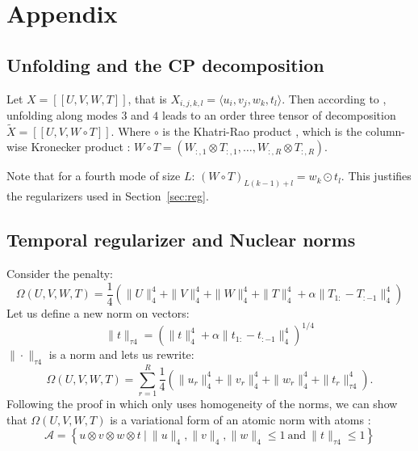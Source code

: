 \documentclass{article}
\newcommand{\brck}[1]{[\![#1]\!]}
\begin{document}
\section{Appendix}
\subsection{Unfolding and the CP decomposition}
\label{app:unfolding}
Let $X=\brck{U,V,W,T}$, that is $X_{i,j,k,l}=\langle u_i, v_j, w_k, t_l\rangle$. Then according to \citet{kolda_tensor_2009}, unfolding along modes $3$ and $4$ leads to an order three tensor of decomposition $\tilde{X}=\brck{U,V,W \circ T}$. Where $\circ$ is the Khatri-Rao product \citep{smilde2005multi}, which is the column-wise Kronecker product : $W\circ T = (W_{:,1}\otimes T_{:, 1}, \dots, W_{:,R}\otimes T_{:, R})$.

Note that for a fourth mode of size $L$: $\left(W \circ T\right)_{L(k-1)+l} = w_k \odot t_l$. This justifies the regularizers used in Section~\ref{sec:reg}.

\subsection{Temporal regularizer and Nuclear norms}
\label{app:temporal_nuclear}
Consider the penalty:
\begin{equation}
    \Omega(U,V,W,T) = \frac{1}{4}\left(\|U\|_4^4 + \|V\|_4^4 + \|W\|_4^4 + \|T\|_4^4 + \alpha\|T_{1:}-T_{:-1}\|_4^4\right)
\end{equation}
Let us define a new norm on vectors:
\begin{equation}
    \|t\|_{\tau 4} = \left(\|t\|_4^4+\alpha\|t_{1:}-t_{:-1}\|_4^4\right)^{1/4}
\end{equation}
$\|\cdot\|_{\tau 4}$ is a norm and lets us rewrite:
\begin{equation}
    \Omega(U,V,W,T) = \sum_{r=1}^R\frac{1}{4}\left(\|u_r\|_4^4 + \|v_r\|_4^4 + \|w_r\|_4^4 + \|t_r\|_{\tau 4}^4\right).
\end{equation}
Following the proof in \citet{lacroix2018canonical} which only uses homogeneity of the norms, we can show that $\Omega(U,V,W,T)$ is a variational form of an atomic norm with atoms :
$$\mathcal{A}=\left\{u\otimes v\otimes w\otimes t~|~\|u\|_4, \|v\|_4, \|w\|_4 \leq 1~\textrm{and}~\|t\|_{\tau 4}\leq 1\right\}$$
\end{document}
